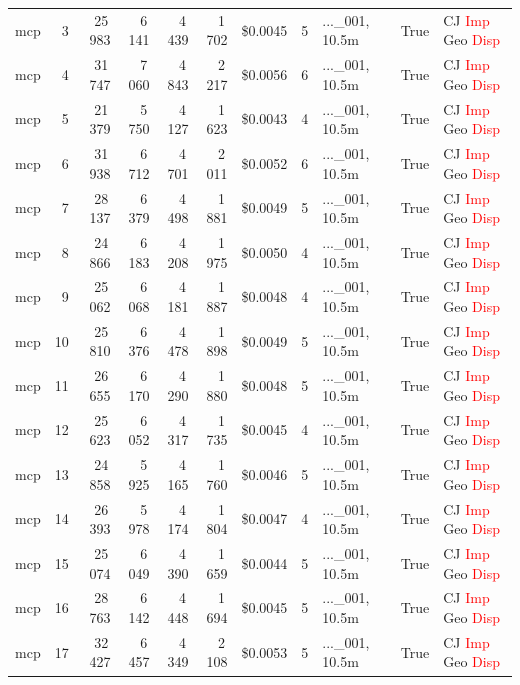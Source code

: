 \documentclass[a4paper,11pt]{article}
\begin{document}
\begin{table}[H]
{\begin{tabular}{l r r r r r r r l r l}
mcp & 3 & 25\,983 & 6\,141 & 4\,439 & 1\,702 & \$0.0045 & 5 & ...\_001, 10.5m & True & CJ \textcolor{red}{Imp} Geo \textcolor{red}{Disp} \\
mcp & 4 & 31\,747 & 7\,060 & 4\,843 & 2\,217 & \$0.0056 & 6 & ...\_001, 10.5m & True & CJ \textcolor{red}{Imp} Geo \textcolor{red}{Disp} \\
mcp & 5 & 21\,379 & 5\,750 & 4\,127 & 1\,623 & \$0.0043 & 4 & ...\_001, 10.5m & True & CJ \textcolor{red}{Imp} Geo \textcolor{red}{Disp} \\
mcp & 6 & 31\,938 & 6\,712 & 4\,701 & 2\,011 & \$0.0052 & 6 & ...\_001, 10.5m & True & CJ \textcolor{red}{Imp} Geo \textcolor{red}{Disp} \\
mcp & 7 & 28\,137 & 6\,379 & 4\,498 & 1\,881 & \$0.0049 & 5 & ...\_001, 10.5m & True & CJ \textcolor{red}{Imp} Geo \textcolor{red}{Disp} \\
mcp & 8 & 24\,866 & 6\,183 & 4\,208 & 1\,975 & \$0.0050 & 4 & ...\_001, 10.5m & True & CJ \textcolor{red}{Imp} Geo \textcolor{red}{Disp} \\
mcp & 9 & 25\,062 & 6\,068 & 4\,181 & 1\,887 & \$0.0048 & 4 & ...\_001, 10.5m & True & CJ \textcolor{red}{Imp} Geo \textcolor{red}{Disp} \\
mcp & 10 & 25\,810 & 6\,376 & 4\,478 & 1\,898 & \$0.0049 & 5 & ...\_001, 10.5m & True & CJ \textcolor{red}{Imp} Geo \textcolor{red}{Disp} \\
mcp & 11 & 26\,655 & 6\,170 & 4\,290 & 1\,880 & \$0.0048 & 5 & ...\_001, 10.5m & True & CJ \textcolor{red}{Imp} Geo \textcolor{red}{Disp} \\
mcp & 12 & 25\,623 & 6\,052 & 4\,317 & 1\,735 & \$0.0045 & 4 & ...\_001, 10.5m & True & CJ \textcolor{red}{Imp} Geo \textcolor{red}{Disp} \\
mcp & 13 & 24\,858 & 5\,925 & 4\,165 & 1\,760 & \$0.0046 & 5 & ...\_001, 10.5m & True & CJ \textcolor{red}{Imp} Geo \textcolor{red}{Disp} \\
mcp & 14 & 26\,393 & 5\,978 & 4\,174 & 1\,804 & \$0.0047 & 4 & ...\_001, 10.5m & True & CJ \textcolor{red}{Imp} Geo \textcolor{red}{Disp} \\
mcp & 15 & 25\,074 & 6\,049 & 4\,390 & 1\,659 & \$0.0044 & 5 & ...\_001, 10.5m & True & CJ \textcolor{red}{Imp} Geo \textcolor{red}{Disp} \\
mcp & 16 & 28\,763 & 6\,142 & 4\,448 & 1\,694 & \$0.0045 & 5 & ...\_001, 10.5m & True & CJ \textcolor{red}{Imp} Geo \textcolor{red}{Disp} \\
mcp & 17 & 32\,427 & 6\,457 & 4\,349 & 2\,108 & \$0.0053 & 5 & ...\_001, 10.5m & True & CJ \textcolor{red}{Imp} Geo \textcolor{red}{Disp} \\

\end{tabular}}
\end{table}
\end{document}
